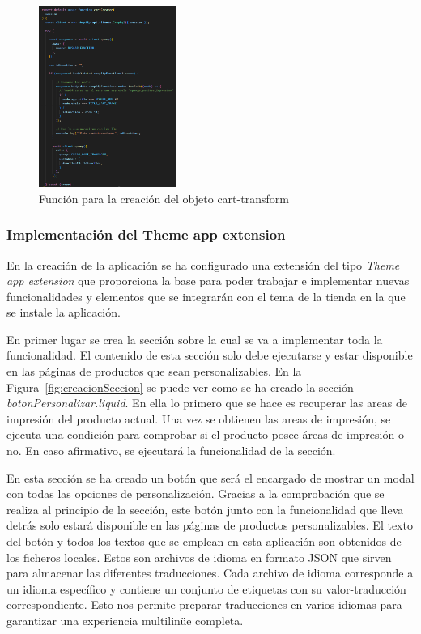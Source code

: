 \documentclass[11pt]{article}
\begin{document}
\begin{figure}[H]
    \centering
    \includegraphics[width=0.4\textwidth]{imagenes-back/funcionCartCreator.png}
    \caption{\label{fig:funcioncartCreat} Función para la creación del objeto cart-transform}
    \vspace{\fill}
\end{figure}



\clearpage
\subsubsection{Implementación del Theme app extension}

En la creación de la aplicación se ha configurado una extensión del tipo \textit{Theme app extension} que proporciona la base para poder trabajar e implementar nuevas funcionalidades
y elementos que se integrarán con el tema de la tienda en la que se instale la aplicación.

En primer lugar se crea la sección sobre la cual se va a implementar toda la funcionalidad. El contenido de esta sección solo debe ejecutarse y estar disponible en las 
páginas de productos que sean personalizables. En la Figura~\ref{fig:creacionSeccion} se puede ver como se ha creado la sección \textit{botonPersonalizar.liquid}. En ella lo primero
que se hace es recuperar las areas de impresión del producto actual. Una vez se obtienen las areas de impresión, se ejecuta una condición para comprobar
si el producto posee áreas de impresión o no. En caso afirmativo, se ejecutará la funcionalidad de la sección.

En esta sección se ha creado un botón que será el encargado de mostrar un modal con todas las opciones de personalización. Gracias a la comprobación
que se realiza al principio de la sección, este botón junto con la funcionalidad que lleva detrás solo estará disponible en las páginas de productos personalizables.
El texto del botón y todos los textos que se emplean en esta aplicación son obtenidos de los ficheros locales. Estos son archivos de idioma en formato 
JSON que sirven para almacenar las diferentes traducciones. Cada archivo de idioma corresponde a un idioma específico y contiene un conjunto de etiquetas con su valor-traducción correspondiente. Esto nos 
permite preparar traducciones en varios idiomas para garantizar una experiencia multilinüe completa.
\end{document}
